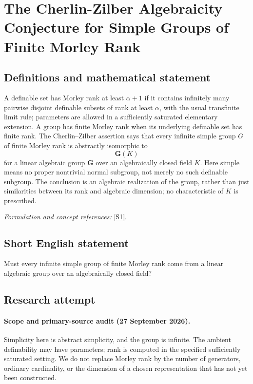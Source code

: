 \documentclass[11pt]{article}
\begin{document}
\section*{\texorpdfstring{The Cherlin-Zilber Algebraicity Conjecture for Simple Groups of Finite Morley Rank}{The Cherlin-Zilber Algebraicity Conjecture for Simple Groups of Finite Morley Rank}}\label{382}
\subsection{Definitions and mathematical statement}
A definable set has Morley rank at least $\alpha+1$ if it contains infinitely many pairwise disjoint definable subsets of rank at least $\alpha$, with the usual transfinite limit rule; parameters are allowed in a sufficiently saturated elementary extension. A group has finite Morley rank when its underlying definable set has finite rank. The Cherlin--Zilber assertion says that every infinite simple group $G$ of finite Morley rank is abstractly isomorphic to
\[
 \mathbf G(K)
\]
for a linear algebraic group $\mathbf G$ over an algebraically closed field $K$. Here simple means no proper nontrivial normal subgroup, not merely no such definable subgroup. The conclusion is an algebraic realization of the group, rather than just similarities between its rank and algebraic dimension; no characteristic of $K$ is prescribed.
\par\smallskip\textit{Formulation and concept references:} \href{https://arxiv.org/abs/2606.18207}{[S1]}.

\subsection{Short English statement}
Must every infinite simple group of finite Morley rank come from a linear algebraic group over an algebraically closed field?
\subsection{Research attempt}
\paragraph{Scope and primary-source audit (27 September 2026).}
Simplicity here is abstract simplicity, and the group is infinite. The
ambient definability may have parameters; rank is computed in the
specified sufficiently saturated setting. We do not replace Morley
rank by the number of generators, ordinary cardinality, or the dimension
of a chosen representation that has not yet been constructed.
\end{document}

